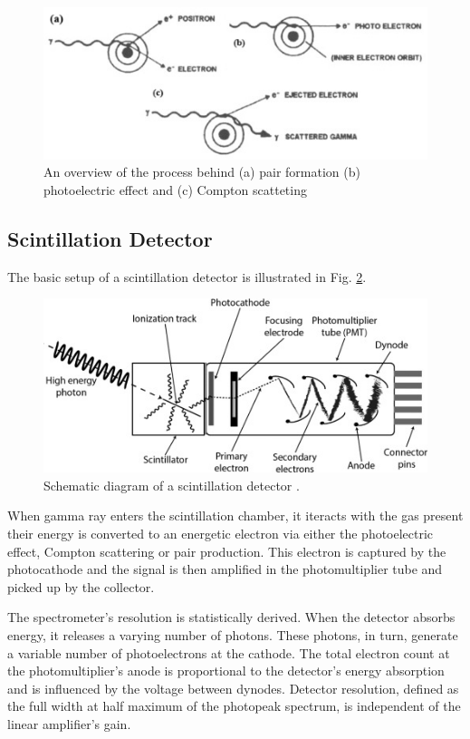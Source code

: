     \begin{figure}[H]
        \centering
        \includegraphics[width=0.8\columnwidth]{images/a.jpg}
        \caption{An overview of the process behind (a) pair formation (b) photoelectric effect and (c) Compton scatteting}
        \label{a}
    \end{figure}

\subsection{Scintillation Detector}

The basic setup of a scintillation detector is illustrated in Fig. \ref{det}.

\begin{figure}[H]
    \centering
    \includegraphics[width=1\columnwidth]{images/det.jpg}
    \caption{Schematic diagram of a scintillation detector \cite{KERLIN2019213}.}
    \label{det}
\end{figure}

When gamma ray enters the scintillation chamber, it iteracts with the gas present their energy is converted to an energetic electron via either the photoelectric effect, Compton scattering or pair production. This electron is captured by the photocathode and the signal is then amplified in the photomultiplier tube and picked up by the collector.  

The spectrometer's resolution is statistically derived. When the detector absorbs energy, it releases a varying number of photons. These photons, in turn, generate a variable number of photoelectrons at the cathode. The total electron count at the photomultiplier's anode is proportional to the detector's energy absorption and is influenced by the voltage between dynodes. Detector resolution, defined as the full width at half maximum of the photopeak spectrum, is independent of the linear amplifier's gain.

